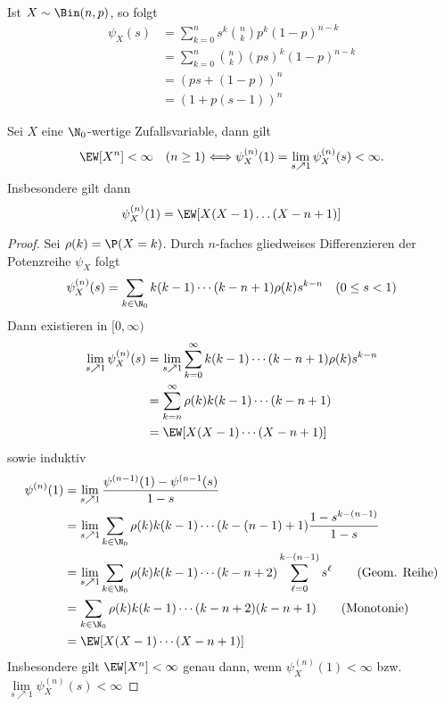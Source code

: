 \begin{beispiel}
	\label{5_15_beispiel}
	Ist $X \sim \Bin(n,p)$, so folgt
	\begin{align*}
		\psi_X (s) &= \sum_{k=0}^n s^k \binom{n}{k} p^k (1-p)^{n-k}\\
		&= \sum_{k=0}^n \binom{n}{k} (ps)^k (1-p)^{n-k}\\
		&= (ps + (1-p))^n \\
		&= (1+p(s-1))^n
	\end{align*}
\end{beispiel}

\begin{proposition}
	\label{5_16_proposition}
	Sei $X$ eine $\N_0$-wertige Zufallsvariable, dann gilt
	\begin{equation*}
		\EW[X^n] < \infty \quad (n \ge 1) \Longleftrightarrow \psi_X^{(n)}(1) = \lim_{s \nearrow 1} \psi_X^{(n)} (s) < \infty.
	\end{equation*}
	Insbesondere gilt dann
	\begin{equation*}
		\psi_X^{(n)} (1) = \EW[X(X-1) \dots (X-n+1)]
	\end{equation*}
\end{proposition}

\begin{proof}
	Sei $\rho(k) = \P(X=k)$. Durch $n$-faches gliedweises Differenzieren der Potenzreihe $\psi_X$ folgt
	\begin{equation*}
		\psi_X^{(n)} (s) = \sum_{k\in \N_0} k(k-1) \cdots (k-n+1) \rho(k) s^{k-n} \quad (0 \le s< 1)
	\end{equation*}
	Dann existieren in $[0, \infty)$
	\begin{equation*}
	\begin{aligned}
		\lim_{s \nearrow 1} \psi_X^{(n)}(s)
		&= \lim_{s \nearrow 1} \sum_{k=0}^{\infty} k(k-1) \cdots (k-n+1) \rho(k) s^{k-n} \\
		&= \sum_{k=n}^{\infty} \rho(k) k(k-1) \cdots (k-n+1)\\
		&= \EW[X(X-1) \cdots (X-n+1)]
	\end{aligned}
	\end{equation*}
	sowie induktiv
	\begin{align}
		\psi^{(n)} (1) 
		&= \lim_{s \nearrow 1} \frac{\psi^{(n-1)}(1) - \psi^{(n-1}(s)}{1-s} \notag \\
		&= \lim_{s \nearrow 1} \sum_{k\in \N_0} \rho(k) k(k-1) \cdots (k-(n-1)+1) \frac{1-s^{k-(n-1)}}{1-s} \notag \\
		&= \lim_{s \nearrow 1} \sum_{k\in \N_0} \rho(k)k(k-1)\cdots (k-n+2) \sum_{\ell=0}^{k-(n-1)} s^\ell \tag{Geom. Reihe} \\
		&= \sum_{k\in \N_0} \rho(k)k(k-1) \cdots (k-n+2)(k-n+1) \tag{Monotonie}\\  
		&= \EW[X(X-1)\cdots (X-n+1)] \notag
	\end{align}
	Insbesondere gilt $\EW[X^n] < \infty$ genau dann, wenn $\psi_X^{(n)}(1) < \infty$ bzw. $\lim\limits_{s \nearrow 1} \psi_X^{(n)} (s) < \infty$
\end{proof}

